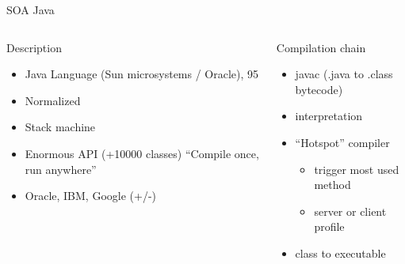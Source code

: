 %
\begin{Frame}{SOA Java}
  \begin{columns}[t]
    \begin{column}{\HW} %
      \begin{block}{Description}
        \begin{itemize}
        \item Java Language (Sun microsystems / Oracle), 95
        \item Normalized
        \item Stack machine
        \item Enormous API (+10000 classes) ``Compile once, run anywhere''
        \item Oracle, IBM, Google (+/-)
        \end{itemize}
      \end{block} 
    \end{column}
    
    \begin{column}{\HW} %
      \begin{block}{Compilation chain}
        \begin{itemize}
        \item javac (.java to .class bytecode)
        \item interpretation
        \item ``Hotspot'' compiler
          \begin{itemize}
          \item trigger most used method
          \item server or client profile
          \end{itemize}
        \item class to executable
        \end{itemize}
      \end{block}   
    \end{column}
  \end{columns}  
\end{Frame}


